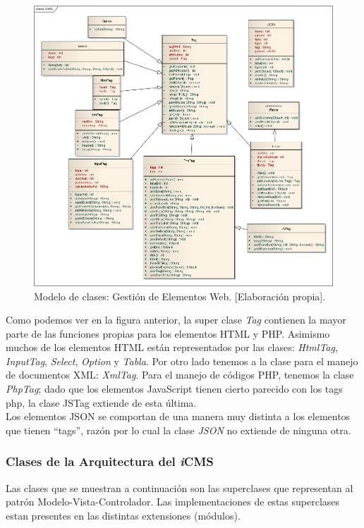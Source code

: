 \begin{figure}[h]
\centering
\includegraphics[scale=.4, keepaspectratio=true]{imagenes/08_imagen.png}
\caption{Modelo de clases: Gesti\'on de Elementos Web. [Elaboraci\'on propia].}
\end{figure}

Como podemos ver en la figura anterior, la super clase \emph{Tag} contienen la mayor parte de las funciones propias para los elementos HTML y PHP. Asimismo muchos de los elementos HTML est\'an representados por las clases: \emph{HtmlTag}, \emph{InputTag}, \emph{Select}, \emph{Option} y \emph{Tabla}. Por otro lado tenemos a la clase para el manejo de documentos XML: \emph{XmlTag}. Para el manejo de c\'odigos PHP, tenemos la clase \emph{PhpTag}; dado que los elementos JavaScript tienen cierto parecido con los tags php, la clase JSTag extiende de esta \'ultima.\\
Los elementos JSON se comportan de una manera muy distinta a los elementos que tienen ``tags'', raz\'on por lo cual la clase \emph{JSON} no extiende de ninguna otra.

\subsubsection{Clases de la Arquitectura del \textit{i}CMS}
Las clases que se muestran a continuaci\'on son las superclases que representan al patr\'on Modelo-Vista-Controlador. Las implementaciones de estas superclases estan presentes en las distintas extensiones (m\'odulos).\\

